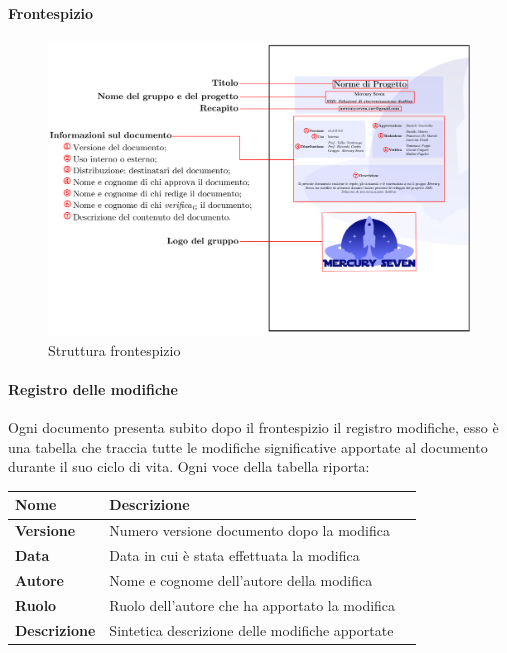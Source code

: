 {\paragraph*{Frontespizio}    

\begin{figure}[H]
    \centering
    \includegraphics[scale = 0.6]{components/immagini/frontespizio.png}
    \caption{Struttura frontespizio}
\end{figure}


\paragraph*{Registro delle modifiche}      
Ogni documento presenta subito dopo il frontespizio il registro modifiche, esso è una tabella che traccia tutte le modifiche significative apportate al documento durante il suo ciclo di vita. Ogni voce della tabella riporta:

	\setlength{\freewidth}{\dimexpr\textwidth-1\tabcolsep}
	\renewcommand{\arraystretch}{1.5}
	\setlength{\aboverulesep}{0pt}
	\setlength{\belowrulesep}{0pt}
	\begin{longtable}{L{.210\freewidth} L{.6\freewidth} L{.080\freewidth}}
		\textbf{Nome} & \textbf{Descrizione} \\
		\toprule
		\endhead		
		
	\textbf{Versione} & Numero versione documento dopo la modifica \\
	\textbf{Data} & Data in cui è stata effettuata la modifica \\
	\textbf{Autore} & Nome e cognome dell'autore della modifica \\
	\textbf{Ruolo} & Ruolo dell'autore che ha apportato la modifica \\
	\textbf{Descrizione} & Sintetica descrizione delle modifiche apportate \\	
		

\end{longtable}}
